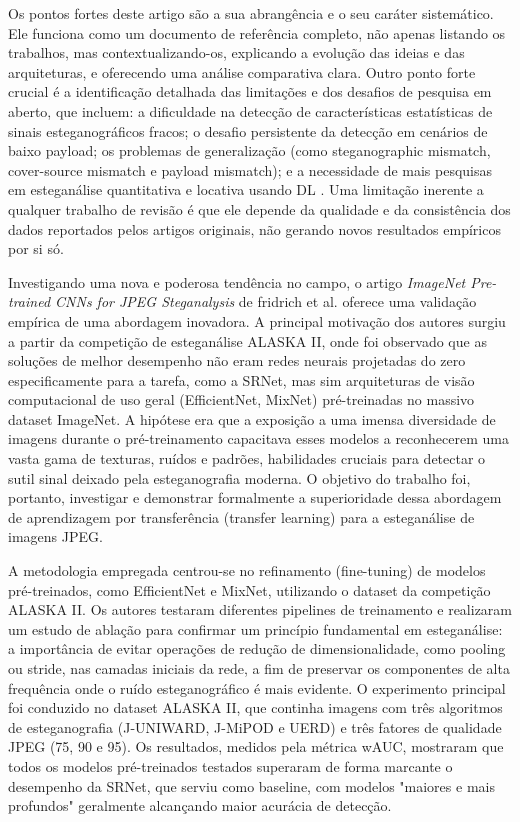 \documentclass[12pt]{article}
\begin{document}
Os pontos fortes deste artigo são a sua abrangência e o seu caráter sistemático. Ele funciona como um documento de referência completo, não apenas listando os trabalhos, mas contextualizando-os, explicando a evolução das ideias e das arquiteturas, e oferecendo uma análise comparativa clara. Outro ponto forte crucial é a identificação detalhada das limitações e dos desafios de pesquisa em aberto, que incluem: a dificuldade na detecção de características estatísticas de sinais esteganográficos fracos; o desafio persistente da detecção em cenários de baixo payload; os problemas de generalização (como steganographic mismatch, cover-source mismatch e payload mismatch); e a necessidade de mais pesquisas em esteganálise quantitativa e locativa usando DL \cite{farooq2023systematic}. Uma limitação inerente a qualquer trabalho de revisão é que ele depende da qualidade e da consistência dos dados reportados pelos artigos originais, não gerando novos resultados empíricos por si só.


Investigando uma nova e poderosa tendência no campo, o artigo \textit{ImageNet Pre-trained CNNs for JPEG Steganalysis} de fridrich et al. \cite{fridrich2020imagenet} oferece uma validação empírica de uma abordagem inovadora. A principal motivação dos autores surgiu a partir da competição de esteganálise ALASKA II, onde foi observado que as soluções de melhor desempenho não eram redes neurais projetadas do zero especificamente para a tarefa, como a SRNet, mas sim arquiteturas de visão computacional de uso geral (EfficientNet, MixNet) pré-treinadas no massivo dataset ImageNet. A hipótese era que a exposição a uma imensa diversidade de imagens durante o pré-treinamento capacitava esses modelos a reconhecerem uma vasta gama de texturas, ruídos e padrões, habilidades cruciais para detectar o sutil sinal deixado pela esteganografia moderna. O objetivo do trabalho foi, portanto, investigar e demonstrar formalmente a superioridade dessa abordagem de aprendizagem por transferência (transfer learning) para a esteganálise de imagens JPEG.

A metodologia empregada centrou-se no refinamento (fine-tuning) de modelos pré-treinados, como EfficientNet e MixNet, utilizando o dataset da competição ALASKA II. Os autores testaram diferentes pipelines de treinamento e realizaram um estudo de ablação para confirmar um princípio fundamental em esteganálise: a importância de evitar operações de redução de dimensionalidade, como pooling ou stride, nas camadas iniciais da rede, a fim de preservar os componentes de alta frequência onde o ruído esteganográfico é mais evidente. O experimento principal foi conduzido no dataset ALASKA II, que continha imagens com três algoritmos de esteganografia (J-UNIWARD, J-MiPOD e UERD) e três fatores de qualidade JPEG (75, 90 e 95). Os resultados, medidos pela métrica wAUC, mostraram que todos os modelos pré-treinados testados superaram de forma marcante o desempenho da SRNet, que serviu como baseline, com modelos "maiores e mais profundos" geralmente alcançando maior acurácia de detecção.
\end{document}
